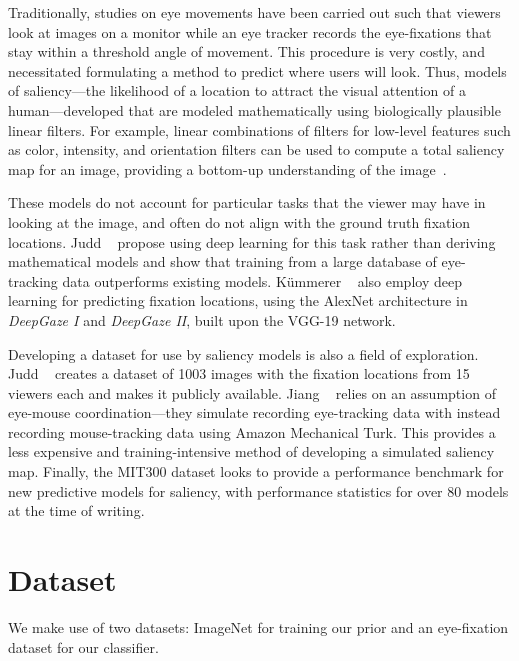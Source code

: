 \documentclass[10pt,twocolumn,letterpaper]{article}
\begin{document}
Traditionally, studies on eye movements have been carried out such that
viewers look at images on a monitor while an eye tracker records the
eye-fixations that stay within a threshold angle of movement. This procedure is
very costly, and necessitated formulating a method to predict where users will
look. Thus, models of saliency---the likelihood of a location to attract the
visual attention of a human---developed that are modeled mathematically using
biologically plausible linear filters. For example, linear combinations of
filters for low-level features such as color, intensity, and orientation
filters can be used to compute a total saliency map for an image,
providing a bottom-up understanding of the image~\cite{Itti}.

These models do not account for particular tasks that the viewer may have in
looking at the image, and often do not align with the ground truth fixation
locations. Judd \etal~\cite{Judd} propose using deep learning for this task
rather than deriving mathematical models and show that training from a large
database of eye-tracking data outperforms existing models. K\"ummerer
\etal~\cite{Kummerer} also employ deep learning for predicting fixation
locations, using the AlexNet architecture in \textit{DeepGaze I} and \textit{DeepGaze II}, built upon the VGG-19 network.

Developing a dataset for use by saliency models is also a field of exploration.
Judd \etal~\cite{Judd} creates a dataset of 1003 images with the fixation
locations from 15 viewers each and makes it publicly available. Jiang
\etal~\cite{Jiang} relies on an assumption of eye-mouse coordination---they
simulate recording eye-tracking data with instead recording mouse-tracking data
using Amazon Mechanical Turk. This provides a less expensive and
training-intensive method of developing a simulated saliency map. Finally, the
MIT300 dataset \cite{mitbench} looks to provide a performance benchmark for new predictive
models for saliency, with performance statistics for over 80 models at the time
of writing. 


\section{Dataset}
We make use of two datasets: ImageNet \cite{imagenet} for training our prior and an
eye-fixation dataset for our classifier. 
\end{document}
